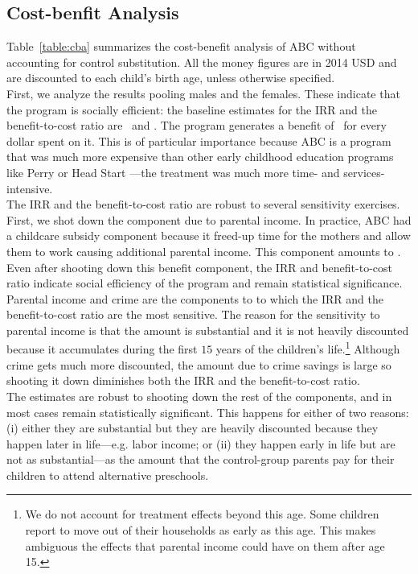 \subsection{Cost-benfit Analysis} \label{section:cbaresults}

\noindent Table~\ref{table:cba} summarizes the cost-benefit analysis of ABC without accounting for control substitution. All the money figures are in 2014 USD and are discounted to each child's birth age, unless otherwise specified.\\

\noindent First, we analyze the results pooling males and the females. These indicate that the program is socially efficient: the baseline estimates for the IRR and the benefit-to-cost ratio are \irrp\ and \bcp. The program generates a benefit of \bcp\ for every dollar spent on it. This is of particular importance because ABC is a program that was much more expensive than other early childhood education programs like Perry or Head Start \citep{Elango_Hojman_etal_2016_Early-Edu}---the treatment was much more time- and services-intensive.\\ 

\noindent The IRR and the benefit-to-cost ratio are robust to several sensitivity exercises. First, we shot down the component due to parental income. In practice, ABC had a childcare subsidy component because it freed-up time for the mothers and allow them to work causing additional parental income. This component amounts to \parincomenpvp. Even after shooting down this benefit component, the IRR and benefit-to-cost ratio indicate social efficiency of the program and remain statistical significance.\\ 

\noindent Parental income and crime are the components to to which the IRR and the benefit-to-cost ratio are the most sensitive. The reason for the sensitivity to parental income is that the amount is substantial and it is not heavily discounted because it accumulates during the first $15$ years of the children's life.\footnote{We do not account for treatment effects beyond this age. Some children report to move out of their households as early as this age. This makes ambiguous the effects that parental income could have on them after age 15.} Although crime gets much more discounted, the amount due to crime savings is large so shooting it down diminishes both the IRR and the benefit-to-cost ratio.\\ 

\noindent The estimates are robust to shooting down the rest of the components, and in most cases remain statistically significant. This happens for either of two reasons: (i) either they are substantial but they are heavily discounted because they happen later in life---e.g. labor income; or (ii) they happen early in life but are not as substantial---as the amount that the control-group parents pay for their children to attend alternative preschools.\\

